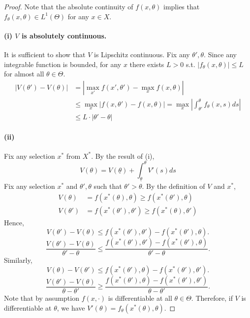 \documentclass[11pt,a4paper,dvipdfmx]{article}
\theoremstyle{plain}
\newcommand{\1}{\mathbbm{1}}
\begin{document}
\begin{proof}
	Note that the absolute continuity of $f(x, \theta)$ implies that $f_\theta(x, \theta) \in L^1(\Theta)$ for any $x \in X$.
	\paragraph{(i) $V$ is absolutely continuous.}
	It is sufficient to show that $V$ is Lipschitz continuous. Fix any $\theta', \theta$. Since any integrable function is bounded, for any $x$ there exists $L>0$ s.t. $|f_\theta(x, \theta)| \leq L$ for almost all $\theta \in \Theta$.
	\begin{align*}
		|V(\theta') - V(\theta)|
		&=
		\left|
		\max_{x'} f(x', \theta') - \max_x f(x, \theta)
		\right| \\
		&\leq
		\max_x
		\left|
		f(x, \theta') - f(x, \theta)
		\right| 
		=
		\max_x
		\left|
		\int_{\theta'}^\theta f_\theta(x, s) ds
		\right| \\
		&\leq L \cdot |\theta' - \theta|
	\end{align*}
	
	\paragraph{(ii)}
	Fix any selection $x^*$ from $X^*$. By the result of (i),
	\[
	V(\theta) = V(\underline{\theta}) + \int_{\underline{\theta}}^\theta V'(s) ds
	\]
	Fix any selection $x^*$ and $\theta', \theta$ such that $\theta' > \theta$. By the definition of $V$ and $x^*$,
	\begin{align*}
		V(\theta) &= f(x^*(\theta), \theta) \geq f(x^*(\theta'), \theta) \\
		V(\theta') &= f(x^*(\theta'), \theta') \geq f(x^*(\theta), \theta')
	\end{align*}
	Hence,
	\[
	V(\theta') - V(\theta) \leq f(x^*(\theta'), \theta') - f(x^*(\theta'), \theta).
	\]
	\[
	\frac{V(\theta') - V(\theta)}{\theta' - \theta} \leq \frac{f(x^*(\theta'), \theta') - f(x^*(\theta'), \theta)}{\theta' - \theta}.
	\]
	Similarly,
	\[
	V(\theta) - V(\theta') \leq f(x^*(\theta'), \theta) - f(x^*(\theta'), \theta').
	\]
	\[
	\frac{V(\theta') - V(\theta)}{\theta - \theta'} \geq \frac{f(x^*(\theta'), \theta) - f(x^*(\theta'), \theta')}{\theta - \theta'}.
	\]
	Note that by assumption $f(x, \cdot)$ is differentiable at all $\theta \in \Theta$. Therefore, if $V$ is differentiable at $\theta$, we have $V'(\theta) = f_\theta(x^*(\theta), \theta)$.
\end{proof}
\end{document}
